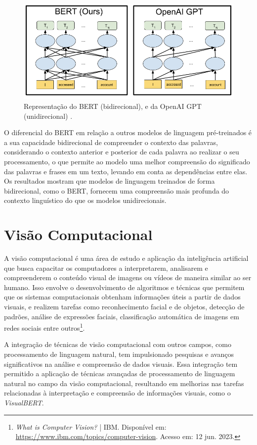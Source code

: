 \begin{figure}[!htbp]
	\centering
	\includegraphics[scale=0.4]{imagens/BERT.png}
    \caption {Representação do BERT (bidirecional), e da OpenAI GPT (unidirecional) \cite{BERTImagem}.}
\end{figure}

O diferencial do BERT em relação a outros modelos de linguagem pré-treinados é a sua capacidade bidirecional de compreender o contexto das palavras, considerando o contexto anterior e posterior de cada palavra ao realizar o seu processamento, o que permite ao modelo uma melhor compreensão do significado das palavras e frases em um texto, levando em conta as dependências entre elas. Os resultados mostram que modelos de linguagem treinados de forma bidirecional, como o BERT, fornecem uma compreensão mais profunda do contexto linguístico do que os modelos unidirecionais.

%

\section{Visão Computacional}

A visão computacional é uma área de estudo e aplicação da inteligência artificial que busca capacitar os computadores a interpretarem, analisarem e compreenderem o conteúdo visual de imagens ou vídeos de maneira similar ao ser humano. Isso envolve o desenvolvimento de algoritmos e técnicas que permitem que os sistemas computacionais obtenham informações úteis a partir de dados visuais, e realizem tarefas como reconhecimento facial e de objetos, detecção de padrões, análise de expressões faciais, classificação automática de imagens em redes sociais entre outros\footnote{\textit{What is Computer Vision?} | IBM. Disponível em: \url{https://www.ibm.com/topics/computer-vision}. Acesso em: 12 jun. 2023.}.

A integração de técnicas de visão computacional com outros campos, como processamento de linguagem natural, tem impulsionado pesquisas e avanços significativos na análise e compreensão de dados visuais. Essa integração tem permitido a aplicação de técnicas avançadas de processamento de linguagem natural no campo da visão computacional, resultando em melhorias nas tarefas relacionadas à interpretação e compreensão de informações visuais, como o \textit{VisualBERT}.

